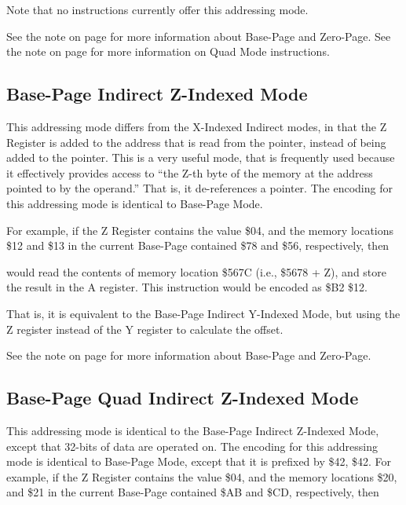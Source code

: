 Note that no instructions currently offer this addressing mode.

See the note on page \pageref{Base-Page (Zero-Page) Mode} for more information about Base-Page and Zero-Page.
See the note on page \pageref{Base-Page (Zero-Page) Quad Mode} for more information on Quad Mode instructions.
\fi

\subsection{Base-Page Indirect Z-Indexed Mode}

This addressing mode differs from the X-Indexed Indirect modes, in that the Z Register is
added to the address that is read from the pointer, instead of being added to the pointer.
This is a very useful mode, that is frequently used because it effectively provides access to
``the Z-th byte of the memory at the address pointed to by the operand.'' That is, it de-references
a pointer.
The encoding for this addressing mode is identical to Base-Page Mode.

For example, if the Z Register contains the value \$04, and the memory locations \$12 and \$13 in the current
Base-Page contained \$78 and \$56, respectively,
then


would read the contents of memory location \$567C (i.e., \$5678 + Z),
and store the result in the A register. This instruction would be encoded as \$B2 \$12.

That is, it is equivalent to the Base-Page Indirect Y-Indexed Mode, but using the Z register instead
of the Y register to calculate the offset.

See the note on page \pageref{Base-Page (Zero-Page) Mode} for more information about Base-Page and Zero-Page.

\subsection{Base-Page Quad Indirect Z-Indexed Mode}

This addressing mode is identical to the Base-Page Indirect Z-Indexed Mode, except that
32-bits of data are operated on. The encoding for this addressing mode is identical to
Base-Page Mode, except that it is prefixed by \$42, \$42.
For example, if the Z Register contains the value \$04, and the memory locations \$20, and \$21 in the current
Base-Page contained \$AB and \$CD, respectively,
then

